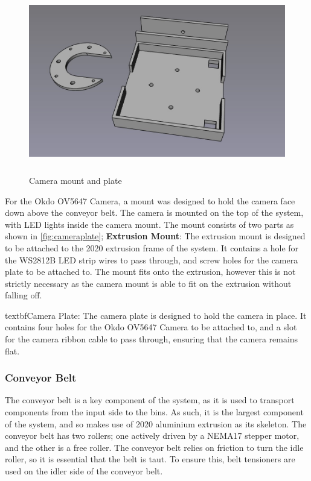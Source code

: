 \begin{figure}[H]
    \begin{minipage}[h]{0.95\textwidth}
        \centering
        \includegraphics[height=8cm]{imgs/freecad/cameraplate.jpg}
        \caption{Camera mount and plate}
        \label{fig:cameraplate}
    \end{minipage}
\end{figure}

For the Okdo OV5647 Camera, a mount was designed to hold the camera face down above the conveyor belt. The camera is mounted on the top of the system, with LED lights inside the camera mount. The mount consists of two parts as shown in \autoref{fig:cameraplate};
\textbf{Extrusion Mount}: The extrusion mount is designed to be attached to the 2020 extrusion frame of the system. It contains a hole for the WS2812B LED strip wires to pass through, and screw holes for the camera plate to be attached to. The mount fits onto the extrusion, however this is not strictly necessary as the camera mount is able to fit on the extrusion without falling off.
\par
textbf{Camera Plate}: The camera plate is designed to hold the camera in place. It contains four holes for the Okdo OV5647 Camera to be attached to, and a slot for the camera ribbon cable to pass through, ensuring that the camera remains flat.
\subsubsection{Conveyor Belt}
\label{sec:conveyor-belt}
The conveyor belt is a key component of the system, as it is used to transport components from the input side to the bins. As such, it is the largest component of the system, and so makes use of 2020 aluminium extrusion as its skeleton. The conveyor belt has two rollers; one actively driven by a NEMA17 stepper motor, and the other is a free roller. The conveyor belt relies on friction to turn the idle roller, so it is essential that the belt is taut. To ensure this, belt tensioners are used on the idler side of the conveyor belt.

